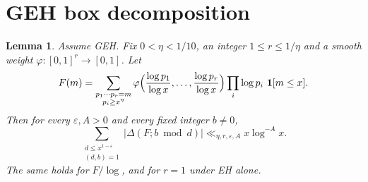 \documentclass[11pt]{amsart}
\newtheorem{lemma}[theorem]{Lemma}
\theoremstyle{definition}
\theoremstyle{remark}
\begin{document}
\section{GEH box decomposition}\label{app:geh}

\begin{lemma}\label{lem:geh-box}
Assume GEH. Fix $0<\eta<1/10$, an integer $1\le r\le1/\eta$ and a smooth weight $\varphi:[0,1]^r\to[0,1]$. Let
\[
F(m)=\sum_{\substack{p_1\cdots p_r=m\\ p_i\ge x^\eta}}\varphi\Bigl(\frac{\log p_1}{\log x},\dots,\frac{\log p_r}{\log x}\Bigr)\prod_{i}\log p_i\ \mathbf 1[m\le x].
\]
Then for every $\varepsilon,A>0$ and every fixed integer $b\ne0$,
\[
\sum_{\substack{d\le x^{1-\varepsilon}\\(d,b)=1}}\bigl|\Delta(F;b\bmod d)\bigr|\ll_{\eta,r,\varepsilon,A}x\log^{-A}x .
\]
The same holds for $F/\log$, and for $r=1$ under EH alone.
\end{lemma}
\end{document}
